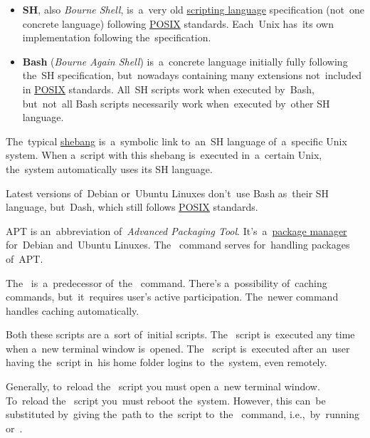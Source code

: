 \label{shbash}
\begin{itemize}
    \item \textbf{SH}, also \textit{Bourne Shell}, is~a~very old \hyperref[scriptinglanguages]{scripting language} specification (not~one concrete language) following \hyperref[posix]{POSIX} standards.
          Each~Unix has~its own implementation following the~specification.
    \item \textbf{Bash} (\textit{Bourne Again Shell}) is~a~concrete language initially fully following the~SH specification, but~nowadays containing many extensions not~included in \hyperref[posix]{POSIX} standards.
          All~SH scripts work when executed by~Bash, but~not~all Bash scripts necessarily work when~executed by~other SH language.
\end{itemize}

\noindent The~typical \hyperref[shebang]{shebang}  is~a~symbolic link to~an~SH language of~a~specific Unix system.
When a~script with this shebang is~executed in~a~certain Unix, the~system automatically uses its SH language.

\warning Latest versions of~Debian or~Ubuntu Linuxes don't~use Bash as~their SH language, but~Dash, which still follows \hyperref[posix]{POSIX} standards.

\label{linuxapt}
APT is an~abbreviation of~\textit{Advanced Packaging Tool}.
It's~a~\hyperref[packagemanager]{package manager} for~Debian and~Ubuntu Linuxes.
The~ command serves for~handling packages of~APT.

The~ is~a~predecessor of~the~ command.
There's a~possibility of~caching  commands, but~it~requires user's active participation.
The~newer  command handles caching automatically.

Both these scripts are a~sort of~initial scripts.
The~ script is~executed any time when a~new terminal window is~opened.
The~ script is~executed after an~user having the~script in~his home folder logins to~the~system, even remotely.

Generally, to~reload the~ script you must open a~new terminal window.
To~reload the~ script you~must reboot the~system.
However, this can~be substituted by~giving the~path to~the~script to~the~ command, i.e.,~by~running  or~.
